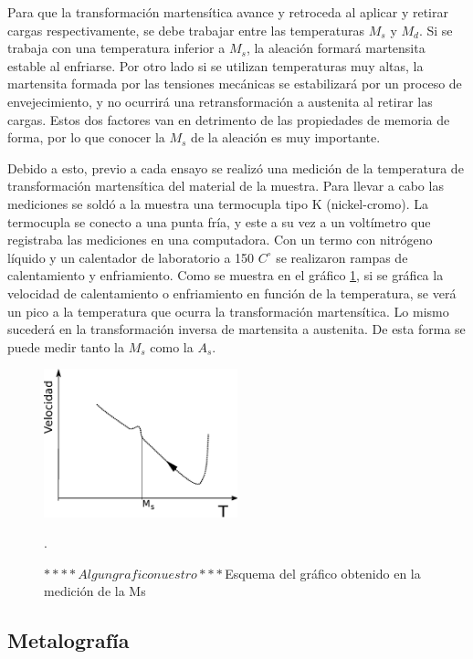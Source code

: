 \documentclass[a4paper,12pt,fleqn,twoside,openany]{book}
\begin{document}
Para que la transformación martensítica avance y retroceda al aplicar y retirar cargas respectivamente,  se debe trabajar entre las temperaturas $M_s$ y $M_d$. Si se trabaja con una temperatura inferior a $M_s$, la aleación formará martensita estable al enfriarse. Por otro lado si se utilizan temperaturas muy altas, la martensita formada  por las tensiones mecánicas se estabilizará por un proceso de envejecimiento, y no ocurrirá una retransformación a austenita al retirar las cargas. Estos dos factores van en detrimento de las propiedades de memoria de forma, por lo que conocer la $M_s$ de la aleación es muy importante.

Debido a esto, previo a cada ensayo se realizó una medición de la temperatura de transformación martensítica del material de la muestra.
Para llevar a cabo las mediciones se soldó a la muestra una termocupla tipo K (nickel-cromo). La termocupla se conecto a una punta fría, y este a su vez a un voltímetro que registraba las mediciones en una computadora. Con un termo con nitrógeno líquido y un calentador de laboratorio a 150 $C^\circ$  se realizaron rampas de calentamiento y enfriamiento. 
Como se muestra en el gráfico \ref{fig:Ms}, si se gráfica la velocidad de calentamiento o enfriamiento en función de la temperatura, se verá un pico a la temperatura que ocurra la transformación martensítica. Lo mismo sucederá en la transformación inversa de martensita a austenita. De esta forma se puede medir tanto la $M_s$ como la $A_s$.



\begin{figure}[h]
 \centering
 \includegraphics[width=0.5\textwidth]{Img/Procedimiento/Ms.eps}
 \caption{$****Algun grafico nuestro***$Esquema del gráfico obtenido en la medición de la Ms}. 
 \label{fig:Ms}
 \end{figure}


\subsection{Metalografía}
\end{document}
